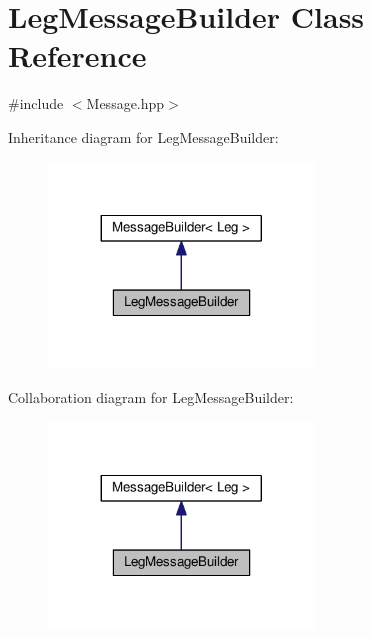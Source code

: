 \hypertarget{classLegMessageBuilder}{}\section{Leg\+Message\+Builder Class Reference}
\label{classLegMessageBuilder}


{\ttfamily \#include $<$Message.\+hpp$>$}



Inheritance diagram for Leg\+Message\+Builder\+:\nopagebreak
\begin{figure}[H]
\begin{center}
\leavevmode
\includegraphics[width=200pt]{classLegMessageBuilder__inherit__graph}
\end{center}
\end{figure}


Collaboration diagram for Leg\+Message\+Builder\+:
\nopagebreak
\begin{figure}[H]
\begin{center}
\leavevmode
\includegraphics[width=200pt]{classLegMessageBuilder__coll__graph}
\end{center}
\end{figure}
